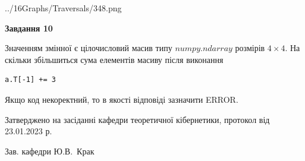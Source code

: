 \documentclass[12pt, ukrainian]{article}
\begin{document}
{\begin {large}
\begin{center}
	{../16Graphs/Traversals/348.png}
\end{center}\par
\newpage

{\begin {center}\textbf{Завдання 10}\end {center}}\par
Значенням змінної  є цілочисловий масив типу $numpy.ndarray$ розмірів $4{\times}4$. На скільки збільшиться сума елементів масиву  після виконання
\begin{verbatim}
a.T[-1] += 3
\end{verbatim}


Якщо код некоректний, то в якості відповіді зазначити ERROR.\par
\newpage


\end {large}
}
{\smallskip \begin {small} Затверджено на засіданні кафедри теоретичної кібернетики, протокол  від   23.01.2023 р.\par\smallskip\smallskip
{\parbox {6.5 cm}{Зав. кафедри \dotfill Ю.В.~Крак}} \end{small}}
\end{document}
